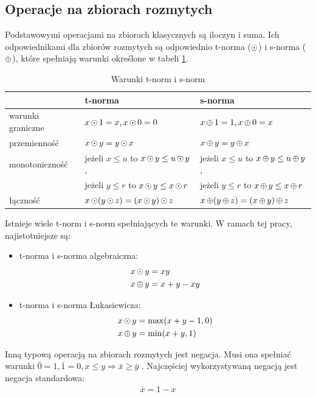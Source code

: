 \documentclass[a4paper,twoside,12pt]{book}
\begin{document}
\subsection{Operacje na zbiorach rozmytych}

Podstawowymi operacjami na zbiorach klasycznych są iloczyn i suma. Ich odpowiednikami dla zbiorów rozmytych są odpowiednio t-norma ($\operatorname*{\odot}$) i s-norma ($\operatorname*{\oplus}$), które spełniają warunki określone w tabeli \ref{id:tab:tnorm-snorm}.

\begin{table}
\centering
\caption{Warunki t-norm i s-norm}
\label{id:tab:tnorm-snorm}
\begin{tabular}{lll}
\toprule
	& t-norma & s-norma  \\
\midrule
	    warunki graniczne & $x \operatorname*{\odot} 1 = x, x \operatorname*{\odot} 0 = 0$ & $x \operatorname*{\oplus} 1 = 1, x \operatorname*{\oplus} 0 = x$ \\
	    przemienność & $x \operatorname*{\odot} y = y \operatorname*{\odot} x$ & $x \operatorname*{\oplus} y = y \operatorname*{\oplus} x$ \\
		monotoniczność & jeżeli $x \le u$ to $x \operatorname*{\odot} y \le u \operatorname*{\odot} y$,  & jeżeli $x \le u$ to $x \operatorname*{\oplus} y \le u \operatorname*{\oplus} y$,\\ 
		& jeżeli $y \le r$ to $x \operatorname*{\odot} y \le x \operatorname*{\odot} r$ & jeżeli $y \le r$ to $x \operatorname*{\oplus} y \le x \operatorname*{\oplus} r$ \\
	    łączność & $x \operatorname*{\odot} (y \operatorname*{\odot} z) = (x \operatorname*{\odot} y) \operatorname*{\odot} z$ & $x \operatorname*{\oplus} (y \operatorname*{\oplus} z) = (x \operatorname*{\oplus} y) \operatorname*{\oplus} z$ \\
\bottomrule
\end{tabular}
\end{table}  

Istnieje wiele t-norm i s-norm spełniających te warunki. W ramach tej pracy, najistotniejsze są:

\begin{itemize}
	\item t-norma i s-norma algebraiczna:
	\begin{align}
		\label{eq:algebraic-norms}
		x \operatorname*{\odot} y &= xy \\
		x \operatorname*{\oplus} y &= x + y - xy
	\end{align}
	\item t-norma i s-norma Łukasiewicza:
	\begin{align}
		x \operatorname*{\odot} y &= \max(x + y - 1, 0) \\
		x \operatorname*{\oplus} y &= \min(x + y, 1)
	\end{align}
\end{itemize}

Inną typową operacją na zbiorach rozmytych jest negacja. Musi ona spełniać warunki $\bar{0} = 1, \bar{1} = 0, x \le y \Rightarrow \bar{x} \ge \bar{y}$ \cite{bib:mathematics-fuzzy-sets-logic}. Najczęściej wykorzystywaną negacją jest negacja standardowa:
\begin{align}
	\bar{x} = 1 - x
\end{align}
\end{document}

